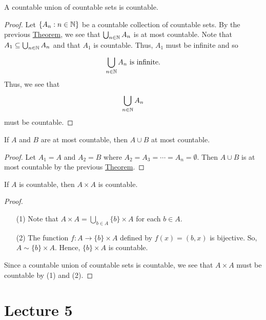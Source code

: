 \documentclass[a4paper]{report}
\begin{document}
\begin{corollary}
A countable union of countable sets is countable.    
\end{corollary}
\begin{proof}
Let \( \{ {A}_{n} : n \in \mathbb{N}  \}  \) be a countable collection of countable sets. By the previous {\hyperref[Countable union of at most countable sets is at most countable]{Theorem}}, we see that \( \bigcup_{ n \in \mathbb{N}  }^{   }  {A}_{n} \) is at most countable. Note that \( {A}_{1} \subseteq \bigcup_{ n \in \mathbb{N}  }^{   } {A}_{n} \) and that \( {A}_{1} \) is countable. Thus, \( {A}_{1} \) must be infinite and so 
\[  \bigcup_{ n \in \mathbb{N}  }^{} {A}_{n}  \ \text{is infinite}. \]
Thus, we see that 
\[  \bigcup_{ n \in \mathbb{N}  }^{  } {A}_{n}  \]
must be countable.
\end{proof}

\begin{corollary}
   If \( A  \) and \( B  \) are at most countable, then \( A \cup B  \) at most countable. 
\end{corollary}
\begin{proof}
Let \( {A}_{1} = A  \) and \( {A}_{2} = B  \) where \( {A}_{2} = {A}_{3} = \cdots = {A}_{n} = \emptyset \). Then \( A \cup B  \) is at most countable by the previous {\hyperref[Countable union of at most countable sets is at most countable]{Theorem}}. 
\end{proof}

\begin{theorem}[ ]
    If \( A  \) is countable, then \( A \times A  \) is countable.
\end{theorem}
\begin{proof}
    \begin{enumerate}
        \item[(1)] Note that \( A \times A  = \bigcup_{ b \in A  }^{  }  \{ b  \}  \times A  \) for each \( b \in A  \).
        \item[(2)] The function \( f: A \to \{ b \}  \times A  \) defined by \( f(x) = (b,x) \) is bijective. So, \( A \sim \{ b \}  \times A  \). Hence, \( \{ b  \}  \times A  \) is countable.
    \end{enumerate}
    Since a countable union of countable sets is countable, we see that \( A \times A  \) must be countable by (1) and (2).
\end{proof}




\section{Lecture 5}
\end{document}
